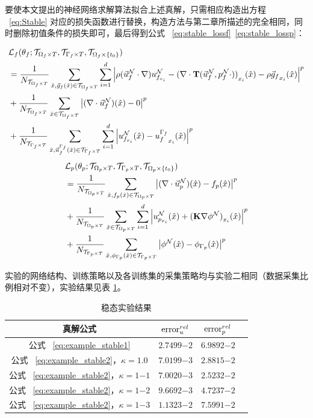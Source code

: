 要使本文提出的神经网络求解算法拟合上述真解，只需相应构造出方程 ~\eqref{eq:Stable} 对应的损失函数进行替换，构造方法与第二章所描述的完全相同，同时删除初值条件的损失即可，最后得到公式 ~\eqref{eq:stable_lossf}~\eqref{eq:stable_lossp}：


\begin{equation}\label{eq:stable_lossf}
    \begin{aligned}
        &\Lossf \\
        &= \toLoss{\TDf}{\x,\gf(\x)}{d}{
            \rho (\NUf \cdot \gradOp) \NUfi 
                - \compx{(\gradOp \cdot \opT{\NUf}{\Npf{\cdot}})} - \rho \compx{\gf}
        } \\
        &+
        \toscaLoss{\TDf}{\x}{
            (\gradOp \cdot \NUf)(\x) - 0
        } \\
        &+
        \toLoss{\TBDf}{\x,\Uf^{\Bf}(\x)}{d}{
            \NUfi(\x) - \compx{u^{\Bf}_{f}}
        }
    \end{aligned}
\end{equation}
\begin{equation}\label{eq:stable_lossp}
    \begin{aligned}
        &\Lossp \\ 
        &= \toscaLoss{\TDp}{\x,\fp(\x)}{
            (\gradOp \cdot \NUp)(\x) - \fp(\x)
        } \\
        &+
        \toLoss{\TDp}{\x}{d}{
            \NUpi(\x) + \compx{(\matfmt{K} \gradOp \Npp)}
        } \\
        &+
        \toscaLoss{\TBDp}{\x,{\pp_{\Bp}}(\x)}{
            \Npp(\x) - \pp_{\Bp}(\x)
        }
    \end{aligned}
\end{equation}

实验的网络结构、训练策略以及各训练集的采集策略均与实验二相同（数据采集比例相对不变），实验结果见表 \ref{tab:example_stable}。

\begin{table}[htb]
    \centering
    \caption{稳态实验结果}
    \begin{tabular}{cccc}
        \toprule
        真解公式 & $\relaErr_{u}$ & $\relaErr_{p}$ \\
        \midrule
        公式 ~\eqref{eq:example_stable1}  & $\num{2.7499}{-2}$ & $\num{6.9892}{-2}$ \\
        公式 ~\eqref{eq:example_stable2}，$\kappa = 1.0$   & $\num{7.0199}{-3}$ & $\num{2.8815}{-2}$ \\
        公式 ~\eqref{eq:example_stable2}，$\kappa = \num{1}{-1}$  & $\num{7.0020}{-3}$ & $\num{2.5232}{-2}$ \\
        公式 ~\eqref{eq:example_stable2}，$\kappa = \num{1}{-2}$ & $\num{9.6692}{-3}$ & $\num{4.7237}{-2}$ \\
        公式 ~\eqref{eq:example_stable2}，$\kappa = \num{1}{-3}$ & $\num{1.1323}{-2}$ & $\num{7.5991}{-2}$ \\
        \bottomrule
    \end{tabular}
    \label{tab:example_stable}
\end{table}

